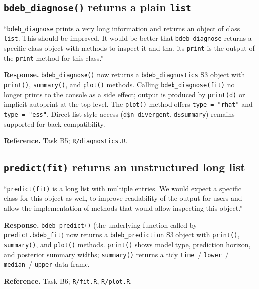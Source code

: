 \documentclass[11pt,a4paper]{article}
\newcommand{\code}[1]{\texttt{#1}}
\begin{document}
\subsection{\code{bdeb\_diagnose()} returns a plain \code{list}}

\begin{displayquote}
``\code{bdeb\_diagnose} prints a very long information and
returns an object of class \code{list}. This should be improved. It
would be better that \code{bdeb\_diagnose} returns a specific class
object with methods to inspect it and that its \code{print} is the
output of the \code{print} method for this class.''
\end{displayquote}

\textbf{Response.} \code{bdeb\_diagnose()} now returns a
\code{bdeb\_diagnostics} S3 object with \code{print()},
\code{summary()}, and \code{plot()} methods. Calling
\verb|bdeb_diagnose(fit)| no longer prints to the console as a side
effect; output is produced by \verb|print(d)| or implicit autoprint
at the top level. The \code{plot()} method offers
\verb|type = "rhat"| and \verb|type = "ess"|. Direct list-style
access (\verb|d$n_divergent|, \verb|d$summary|) remains supported for
back-compatibility.

\textbf{Reference.} Task B5; \code{R/diagnostics.R}.

\subsection{\code{predict(fit)} returns an unstructured long list}

\begin{displayquote}
``\verb|predict(fit)| is a long list with multiple entries. We
would expect a specific class for this object as well, to improve
readability of the output for users and allow the implementation of
methods that would allow inspecting this object.''
\end{displayquote}

\textbf{Response.} \code{bdeb\_predict()} (the underlying function
called by \code{predict.bdeb\_fit}) now returns a
\code{bdeb\_prediction} S3 object with \code{print()},
\code{summary()}, and \code{plot()} methods. \code{print()} shows
model type, prediction horizon, and posterior summary widths;
\code{summary()} returns a tidy \code{time}~/ \code{lower}~/
\code{median}~/ \code{upper} data frame.

\textbf{Reference.} Task B6; \code{R/fit.R}, \code{R/plot.R}.
\end{document}
